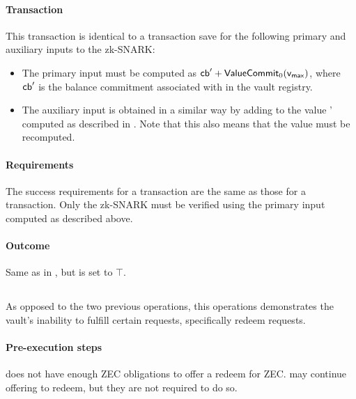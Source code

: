 \paragraph{Transaction}
This transaction is identical to a \submitPOB transaction save for the following primary and auxiliary inputs to the zk-SNARK:
\begin{itemize}
    \item The primary input \cb must be computed as $\mathsf{cb}' + \mathsf{ValueCommit}_{0}(\mathsf{v_{max}})$, where $\mathsf{cb}'$ is the balance commitment associated with \vault in the vault registry.
    
    \item The auxiliary input \bal is obtained in a similar way by adding \vmax to the value \bal' computed as described in \submitPOBop.
    Note that this also means that the value \rem must be recomputed.
\end{itemize}

\paragraph{Requirements}
The success requirements for a \submitPOC transaction are the same as those for a \submitPOB transaction.
Only the zk-SNARK must be verified using the primary input \cb computed as described above.

\paragraph{Outcome}
Same as in \submitPOB, but \acci is set to $\top$.
    
\subsection{\submitPOIop}
As opposed to the two previous operations, this operations demonstrates the vault's inability to fulfill certain requests, specifically redeem requests.

\paragraph{Pre-execution steps}
\vault does not have enough ZEC obligations to offer a redeem for \vmax ZEC.
\vault may continue offering to redeem, but they are not required to do so.

